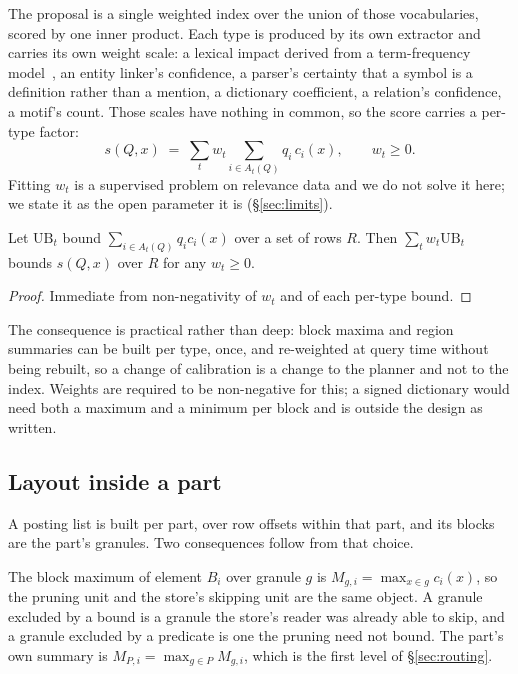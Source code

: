 \proposed{} The proposal is a single weighted index over the union of those
vocabularies, scored by one inner product. Each type is produced by its own
extractor and carries its own weight scale: a lexical impact derived from a
term-frequency model~\cite{robertson2009bm25}, an entity linker's confidence, a
parser's certainty that a symbol is a definition rather than a mention, a
dictionary coefficient, a relation's confidence, a motif's count. Those scales
have nothing in common, so the score carries a per-type factor:
\[
  s(Q,x) \;=\; \sum_t w_t \sum_{i \in A_t(Q)} q_i\, c_i(x),
  \qquad w_t \ge 0 .
\]
Fitting $w_t$ is a supervised problem on relevance data and we do not solve it
here; we state it as the open parameter it is (\S\ref{sec:limits}).

\begin{proposition}
Let $\mathrm{UB}_t$ bound $\sum_{i \in A_t(Q)} q_i c_i(x)$ over a set of rows
$R$. Then $\sum_t w_t \mathrm{UB}_t$ bounds $s(Q,x)$ over $R$ for any
$w_t \ge 0$.
\end{proposition}
\begin{proof}
Immediate from non-negativity of $w_t$ and of each per-type bound.
\end{proof}

The consequence is practical rather than deep: block maxima and region
summaries can be built per type, once, and re-weighted at query time without
being rebuilt, so a change of calibration is a change to the planner and not to
the index. Weights are required to be non-negative for this; a signed
dictionary would need both a maximum and a minimum per block and is outside the
design as written.

\subsection{Layout inside a part}

\proposed{} A posting list is built per part, over row offsets within that
part, and its blocks are the part's granules. Two consequences follow from that
choice.

The block maximum of element $B_i$ over granule $g$ is
$M_{g,i} = \max_{x \in g} c_i(x)$, so the pruning unit and the store's skipping
unit are the same object. A granule excluded by a bound is a granule the
store's reader was already able to skip, and a granule excluded by a predicate
is one the pruning need not bound. The part's own summary is
$M_{P,i} = \max_{g \in P} M_{g,i}$, which is the first level of
\S\ref{sec:routing}.

